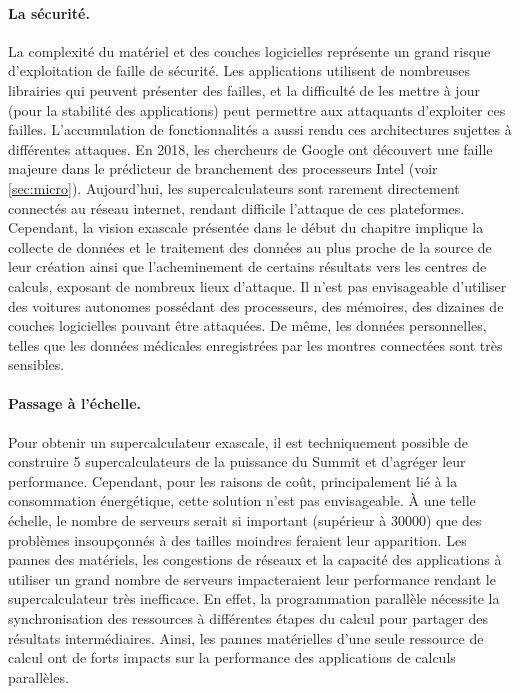         \paragraph{La sécurité.} La complexité du matériel et des couches logicielles représente un grand risque d'exploitation de faille de sécurité. Les applications utilisent de nombreuses librairies qui peuvent présenter des failles, et la difficulté de les mettre à jour (pour la stabilité des applications) peut permettre aux attaquants d'exploiter ces failles. L'accumulation de fonctionnalités a aussi rendu ces architectures sujettes à différentes attaques. En 2018, les chercheurs de Google \cite{kocher2018spectre} ont découvert une faille majeure dans le prédicteur de branchement des processeurs Intel (voir \autoref{sec:micro}). Aujourd'hui, les supercalculateurs sont rarement directement connectés au réseau internet, rendant difficile l'attaque de ces plateformes. Cependant, la vision exascale présentée dans le début du chapitre implique la collecte de données et le traitement des données au plus proche de la source de leur création ainsi que l'acheminement de certains résultats vers les centres de calculs, exposant de nombreux lieux d'attaque. Il n’est pas envisageable d'utiliser des voitures autonomes possédant des processeurs, des mémoires, des dizaines de couches logicielles pouvant être attaquées. De même, les données personnelles, telles que les données médicales enregistrées par les montres connectées sont très sensibles.
    
        
        \paragraph{Passage à l'échelle.} Pour obtenir un supercalculateur exascale, il est techniquement possible de construire 5 supercalculateurs de la puissance du Summit et d’agréger leur performance. Cependant, pour les raisons de coût, principalement lié à la consommation énergétique, cette solution n’est pas envisageable. À une telle échelle, le nombre de serveurs serait si important (supérieur à 30000) que des problèmes insoupçonnés à des tailles moindres feraient leur apparition. Les pannes des matériels, les congestions de réseaux et la capacité des applications à utiliser un grand nombre de serveurs impacteraient leur performance rendant le supercalculateur très inefficace. En effet, la programmation parallèle nécessite la synchronisation des ressources à différentes étapes du calcul pour partager des résultats intermédiaires. Ainsi, les pannes matérielles d'une seule ressource de calcul ont de forts impacts sur la performance des applications de calculs parallèles. 
        

